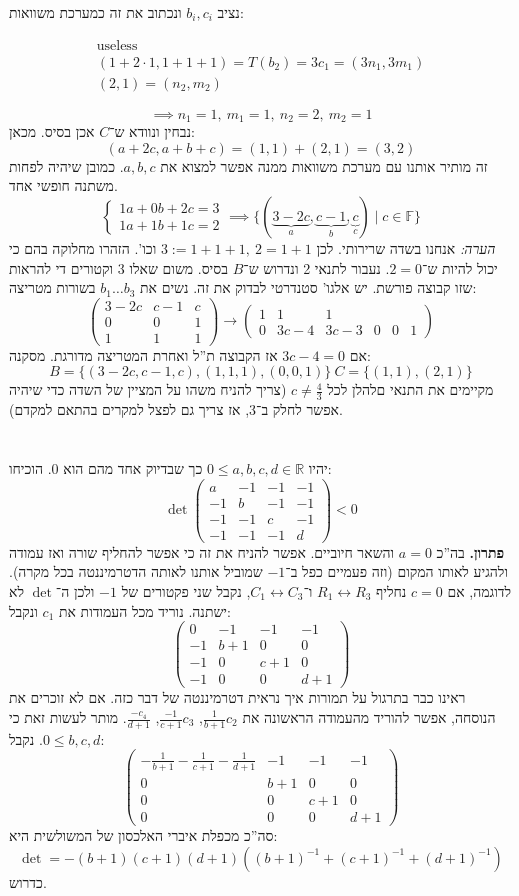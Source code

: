 \documentclass[]{article}
\newcommand\sen   {\begin{otherlanguage}{english}}
\newcommand\she   {\end{otherlanguage}}
\newcommand\R     {\mathbb{R}}
\newcommand\lra       {\leftrightarrow}
\newcommand\F         {\mathbb{F}}
\newcommand\pms[1]    {\begin{pmatrix}
		#1
\end{pmatrix}}
\newcommand\op    {^{-1}}
\newcommand\cl [1]    {\left ( #1 \right )}
\newcommand\dequad    {\!\!\!\!\!\!}
\theoremstyle{definition}
\begin{document}
	נציב $b_i, c_i$	ונכתוב את זה כמערכת משוואות: 
	\sen\begin{align}
		\text{useless} \\ 
		(1 + 2 \cdot 1, 1 + 1 + 1) = T(b_2) = 3c_1 = (3n_1, 3m_1) \\
		(2, 1) = (n_2, m_2)
	\end{align}\she
	\[ \implies n_1 = 1, \ m_1 = 1, \ n_2 = 2, \ m_2 = 1 \]
	נבחין ונוודא ש־$C$ אכן בסיס. מכאן: 
	\[ (a + 2c, a + b + c) = (1, 1) + (2, 1) = (3, 2) \]
	זה מותיר אותנו עם מערכת משוואות ממנה אפשר למצוא את $a, b, c$. כמובן שיהיה לפחות משתנה חופשי אחד. 
	\[ \begin{cases}
		1a + 0b + 2c = 3 \\
		1a + 1b + 1c = 2
	\end{cases} \dequad\implies \{(\underbrace{3 - 2c}_a, \underbrace{c - 1}_{b}, \underbrace{c}_{c}) \mid c \in \F\} \]
	\textit{הערה: }אנחנו בשדה שרירותי. לכן $3:= 1 + 1 + 1, \ 2 = 1 + 1$ וכו'. הזהרו מחלוקה בהם כי יכול להיות ש־$2 = 0$. 
	נעבור לתנאי 2 ונדרוש ש־$B$ בסיס. משום שאלו $3$ וקטורים די להראות שזו קבוצה פורשת. 
	יש אלגו' סטנדרטי לבדוק את זה. נשים את $b_1 \dots b_3$ בשורות מטריצה: 
	\[ \pms{3 - 2c & c - 1 & c \\ 0  & 0 & 1 \\ 1 & 1 & 1} \to \pms{1 &1 &1 \\ 0 & 3c - 4 & 3c - 3 & 0 & 0 &1} \]
	אם $3c - 4  =0$ אז הקבוצה ת''ל ואחרת המטריצה מדורגת. 
	מסקנה: 
	\[ B = \{(3 - 2c, c - 1, c), (1, 1, 1), (0, 0, 1)\} \ C = \{(1, 1), (2, 1)\} \]
	מקיימים את התנאי םלהלן לכל $c \neq \frac{4}{3}$ (צריך להניח משהו על המציין של השדה כדי שיהיה אפשר לחלק ב־$3$, אז צריך גם לפצל למקרים בהתאם למקדם). 
	
	\section{}
	יהיו $0 \le a, b, c, d \in \R$ כך שבדיוק אחד מהם הוא $0$. הוכיחו: 
	\[ \det\pms{a & -1 & -1 & -1 \\ -1 & b & -1 & -1 \\ -1 & -1 & c & -1 \\ -1 & -1 & -1 & d} < 0 \]
	\textbf{פתרון. }
	בה''כ $a  = 0$ והשאר חיוביים. אפשר להניח את זה כי אפשר להחליף שורה ואז עמודה ולהגיע לאותו המקום (וזה פעמיים כפל ב־$-1$ שמוביל אותנו לאותה הדטרמיננטה בכל מקרה). לדוגמה, אם $c = 0$ נחליף $R_1 \lra R_3$ ו־$C_1 \lra C_3$, נקבל שני פקטורים של $-1$ ולכן ה־$\det$ לא ישתנה. נוריד מכל העמודות את $c_1$ ונקבל: 
	\[ \pms{0 & -1 & -1 & -1 \\ -1 & b + 1 & 0 & 0 \\ -1 & 0 & c + 1 & 0 \\ -1 & 0 & 0 & d + 1} \]
	ראינו כבר בתרגול על תמורות איך נראית דטרמיננטה של דבר כזה. אם לא זוכרים את הנוסחה, אפשר להוריד מהעמודה הראשונה את $\frac{1}{b + 1}c_2$, $\frac{-1}{c + 1}c_3$, $\frac{-c_4}{d + 1}$. מותר לעשות זאת כי $0 \le b, c, d$. נקבל: 
	\[ \pms{-\frac{1}{b + 1} - \frac{1}{c + 1} - \frac{1}{d + 1} & - 1 & -1 & -1 \\ 0 & b + 1 & 0 & 0 \\ 0 & 0 & c + 1 & 0 \\ 0 & 0 & 0 & d + 1} \]
	סה''כ מכפלת איברי האלכסון של המשולשית היא: 
	\[ \det = -(b + 1)(c + 1)(d + 1)\cl{(b + 1)\op + (c + 1)\op + (d + 1)\op} \]
	כדרוש. 
	
\end{document}
